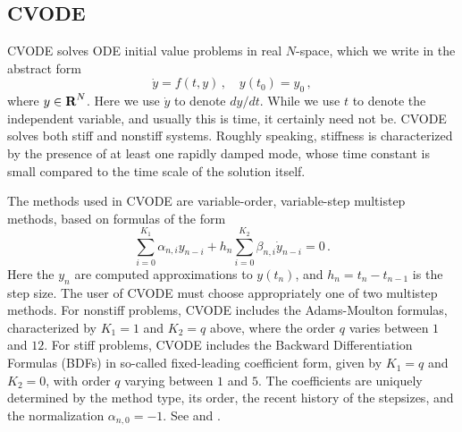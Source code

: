 \subsection{CVODE}\label{ss:cvode}

CVODE solves ODE initial value problems in real $N$-space, which we
write in the abstract form
\begin{equation}\label{ODE} 
  \dot{y} = f(t,y) \, ,\quad y(t_0) = y_0 \, ,
\end{equation}
where $y \in \mbox{\bf R}^N$.
Here we use $\dot{y}$ to denote $dy/dt$.  While we use $t$ to denote
the independent variable, and usually this is time, it certainly need
not be.  CVODE solves both stiff and nonstiff systems.  Roughly
speaking, stiffness is characterized by the presence of at least one
rapidly damped mode, whose time constant is small compared to the time
scale of the solution itself.

The methods used in CVODE are variable-order, variable-step multistep
methods, based on formulas of the form
\begin{equation*}
 \sum_{i = 0}^{K_1} \alpha_{n,i} y_{n-i} + 
     h_n \sum_{i = 0}^{K_2} \beta_{n,i} \dot{y}_{n-i} = 0 \, .
\end{equation*}
Here the $y_n$ are computed approximations to $y(t_n)$, and
$h_n = t_n - t_{n-1}$ is the step size.  The user of CVODE must choose
appropriately one of two multistep methods.  For nonstiff problems,
CVODE includes the Adams-Moulton formulas, characterized by $K_1 = 1$
and $K_2 = q$ above, where the order $q$ varies between $1$ and $12$.
For stiff problems, CVODE includes the Backward Differentiation
Formulas (BDFs) in so-called fixed-leading coefficient form, given by
$K_1 = q$ and $K_2 = 0$, with order $q$ varying between $1$ and $5$.
The coefficients are uniquely determined by the method type, its
order, the recent history of the stepsizes, and the normalization
$\alpha_{n,0} = -1$.  See \cite{ByHi:75} and \cite{JaSD:80}.

